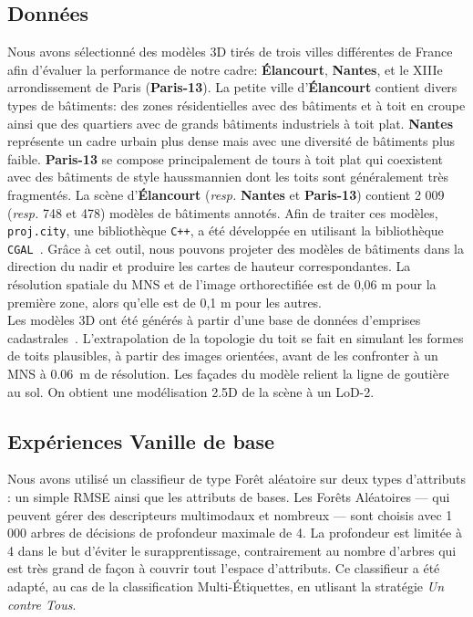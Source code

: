     \subsection*{Données}
        Nous avons sélectionné des modèles 3D tirés de trois villes différentes de France afin d'évaluer la performance de notre cadre: \textbf{\'Elancourt}, \textbf{Nantes}, et le XIIIe arrondissement de Paris (\textbf{Paris-13}).
        La petite ville d'\textbf{\'Elancourt} contient divers types de bâtiments: des zones résidentielles avec des bâtiments et à toit en croupe ainsi que des quartiers avec de grands bâtiments industriels à toit plat.
        \textbf{Nantes} représente un cadre urbain plus dense mais avec une diversité de bâtiments plus faible.
        \textbf{Paris-13} se compose principalement de tours à toit plat qui coexistent avec des bâtiments de style haussmannien dont les toits sont généralement très fragmentés.
        La scène d'\textbf{\'Elancourt} (\textit{resp.} \textbf{Nantes} et \textbf{Paris-13}) contient 2 009 (\textit{resp.} 748 et 478) modèles de bâtiments annotés.
        Afin de traiter ces modèles, \verb!proj.city!, une bibliothèque \verb!C++!, a été développée en utilisant la bibliothèque \verb!CGAL!~\parencite{fabri2000design}.
        Grâce à cet outil, nous pouvons projeter des modèles de bâtiments dans la direction du nadir et produire les cartes de hauteur correspondantes.
        La résolution spatiale du MNS et de l'image orthorectifiée est de 0,06 m pour la première zone, alors qu'elle est de 0,1 m pour les autres.\\

        Les modèles 3D ont été générés à partir d'une base de données d'emprises cadastrales~\parencite{durupt2006automatic}.
        L'extrapolation de la topologie du toit se fait en simulant les formes de toits plausibles, à partir des images orientées, avant de les confronter à un MNS à \SI{0,06}{\m} de résolution.
        Les façades du modèle relient la ligne de goutière au sol.
        On obtient une modélisation 2.5D de la scène à un LoD-2.

    \subsection*{Expériences Vanille de base}
        Nous avons utilisé un classifieur de type Forêt aléatoire sur deux types d'attributs : un simple RMSE ainsi que les attributs de bases.
        Les Forêts Aléatoires --- qui peuvent gérer des descripteurs multimodaux et nombreux --- sont choisis avec 1 000 arbres de décisions de profondeur maximale de 4.
        La profondeur est limitée à 4 dans le but d'éviter le surapprentissage, contrairement au nombre d'arbres qui est très grand de façon à couvrir tout l'espace d'attributs.
        Ce classifieur a été adapté, au cas de la classification Multi-\'Etiquettes, en utlisant la stratégie \textit{Un contre Tous}.\\

